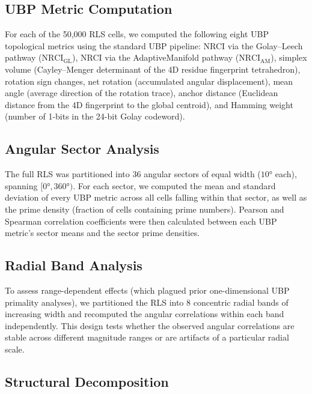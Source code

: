 \documentclass[11pt,a4paper]{article}
\theoremstyle{definition}
\begin{document}
\subsection{UBP Metric Computation}\label{sec:ubp_comp}

For each of the 50,000 RLS cells, we computed the following eight UBP topological metrics using the standard UBP pipeline\cite{ubp_primes}: NRCI via the Golay--Leech pathway ($\text{NRCI}_{\text{GL}}$), NRCI via the AdaptiveManifold pathway ($\text{NRCI}_{\text{AM}}$), simplex volume (Cayley--Menger determinant of the 4D residue fingerprint tetrahedron), rotation sign changes, net rotation (accumulated angular displacement), mean angle (average direction of the rotation trace), anchor distance (Euclidean distance from the 4D fingerprint to the global centroid), and Hamming weight (number of 1-bits in the 24-bit Golay codeword).

\subsection{Angular Sector Analysis}\label{sec:angular}

The full RLS was partitioned into 36 angular sectors of equal width ($10°$ each), spanning $[0°, 360°)$. For each sector, we computed the mean and standard deviation of every UBP metric across all cells falling within that sector, as well as the prime density (fraction of cells containing prime numbers). Pearson and Spearman correlation coefficients were then calculated between each UBP metric's sector means and the sector prime densities.

\subsection{Radial Band Analysis}\label{sec:radial}

To assess range-dependent effects (which plagued prior one-dimensional UBP primality analyses\cite{ubp_music}), we partitioned the RLS into 8 concentric radial bands of increasing width and recomputed the angular correlations within each band independently. This design tests whether the observed angular correlations are stable across different magnitude ranges or are artifacts of a particular radial scale.

\subsection{Structural Decomposition}\label{sec:decomp}
\end{document}
